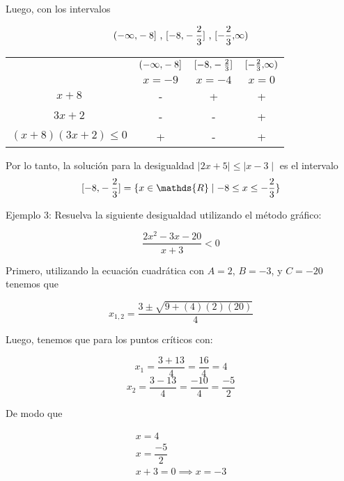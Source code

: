\documentclass[a4paper,12pt]{article}
\begin{document}
Luego, con los intervalos

\[  \interval({-\infty,-8}] \text{ , } \interval[{-8, -\frac{2}{3}}] \text{ , } \interval[{-\frac{2}{3},\infty}) \]


\bgroup
\def\arraystretch{1.5}%
\begin{table}[ht!]
\begin{center}
\begin{tabular}{ c | c  c  c }
		& $\interval({-\infty,-8}]$ & $\interval[{-8, -\frac{2}{3}}]$ & $\interval[{-\frac{2}{3},\infty})$ \\ [0.5ex]
	& $x=-9$ & $x=-4$ 	& $x=0$ \\ 	\hline
	$x+8$ & - & + & + \\
	$3x+2$ & - & - & + \\
	$(x+8)(3x+2)\leq 0$ & + & - & + \\ 
\end{tabular}
\end{center}
\end{table}


Por lo tanto, la solución para la desigualdad $\mid 2x + 5 \mid \leq \mid x-3 \mid$ es el intervalo \\

\[ \interval[{-8,-\frac{2}{3}}] = \{ x \in \mathds{R} \mid -8 \leq x \leq -\frac{2}{3} \} \]





\newpage

Ejemplo 3: Resuelva la siguiente desigualdad utilizando el método gráfico:

\[
	\frac{2x^2 -3x -20}{x+3} < 0
\]

\vspace{1cm}

Primero, utilizando la ecuación cuadrática con $A = 2$, $B = -3$, y $C= -20$ tenemos que

\[
	x_{1,2} = \dfrac{3 \pm \sqrt{9 + (4)(2)(20)}}{4}
\]

Luego, tenemos que para los puntos críticos con:

\[
	x_1 = \frac{3 + 13}{4} = \frac{16}{4} = 4
\]
\[
	x_2 = \frac{3 - 13}{4} = \frac{-10}{4} = \frac{-5}{2}
\]

De modo que 

\begin{align*}
	x = 4 \\
	x = \dfrac{-5}{2}\\
	x+3 = 0 \implies x = -3
\end{align*}
\end{document}
